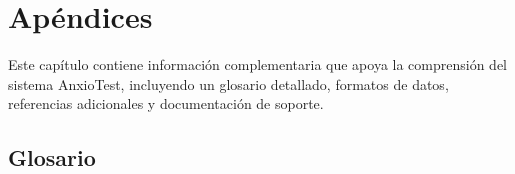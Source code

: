 \section{Apéndices}
\label{sec:apendices}

Este capítulo contiene información complementaria que apoya la comprensión del sistema AnxioTest, incluyendo un glosario detallado, formatos de datos, referencias adicionales y documentación de soporte.

\subsection{Glosario}
\label{sec:glosario}

